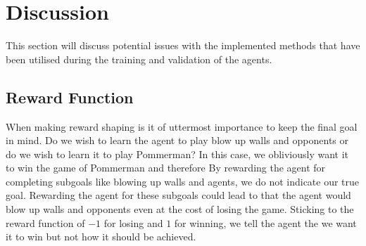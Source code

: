 \section{Discussion}
\label{sec:discussion}
This section will discuss potential issues with the implemented methods that have been utilised during the training and validation of the agents.

\subsection{Reward Function}
When making reward shaping is it of uttermost importance to keep the final goal in mind. Do we wish to learn the agent to play blow up walls and opponents or do we wish to learn it to play Pommerman? In this case, we obliviously want it to win the game of Pommerman and therefore \emph{}\cite{sutton1998a} By rewarding the agent for completing subgoals like blowing up walls and agents, we do not indicate our true goal. Rewarding the agent for these subgoals could lead to that the agent would blow up walls and opponents even at the cost of losing the game. Sticking to the reward function of $-1$ for losing and $1$ for winning, we tell the agent the we want it to win but not how it should be achieved.\cite{sutton1998a}

